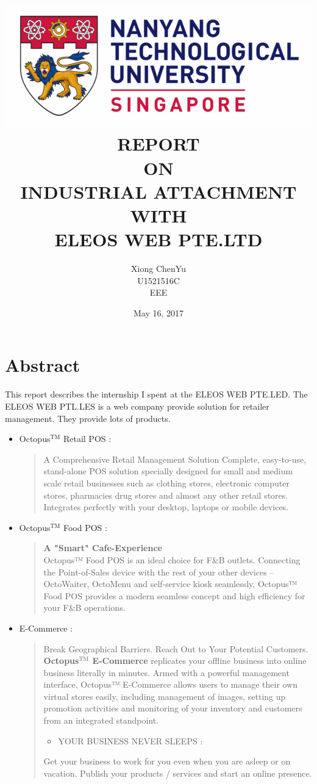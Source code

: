 \documentclass[12pt]{scrartcl}
\author{Xiong ChenYu \\
U1521516C \\
EEE \\
}
\date{May 16, 2017 \\
}
\title{\includegraphics[width=\textwidth]{img/NTU.png} \\
[3\baselineskip] REPORT \\
ON \\
INDUSTRIAL ATTACHMENT \\
WITH \\
ELEOS WEB PTE.LTD \\
[3\baselineskip]}
\begin{document}
\maketitle
\tableofcontents

\listoftables
\listoffigures

\newpage
\section{Abstract}
\label{sec:org52b434c}
This report describes the internship I spent at the ELEOS WEB PTE.LED. The
ELEOS WEB PTL.LES is a web company provide solution for retailer management.
They provide lots of products.
\begin{itemize}
\item Octopus\(^{\text{TM}}\) Retail POS :

\begin{quote}
A Comprehensive Retail Management Solution
Complete, easy-to-use, stand-alone POS solution specially designed for small
and medium scale retail businesses such as clothing stores, electronic
computer stores, pharmacies drug stores and almost any other retail stores.
Integrates perfectly with your desktop, laptops or mobile devices.
\end{quote}

\item Octopus\(^{\text{TM}}\) Food POS :
\begin{quote}
\textbf{A "Smart" Cafe-Experience}  \\
Octopus™ Food POS is an ideal choice for F\&B outlets. Connecting the
Point-of-Sales device with the rest of your other devices – OctoWaiter, OctoMenu
and self-service kiosk seamlessly, Octopus™ Food POS provides a modern seamless
concept and high efficiency for your F\&B operations.
\end{quote}

\item E-Commerce :
\begin{quote}
Break Geographical Barriers. Reach Out to Your Potential Customers. \\
\textbf{Octopus\(^{\text{TM}}\) E-Commerce} replicates your offline business into online business
literally in minutes. Armed with a powerful management interface, Octopus™
E-Commerce allows users to manage their own virtual stores easily, including
management of images, setting up promotion activities and monitoring of your
inventory and customers from an integrated standpoint.

\begin{itemize}
\item YOUR BUSINESS NEVER SLEEPS :
\end{itemize}
Get your business to work for you even when you are asleep or on vacation.
Publish your products / services and start an online presence.


\end{quote}
\end{itemize}
\end{document}
